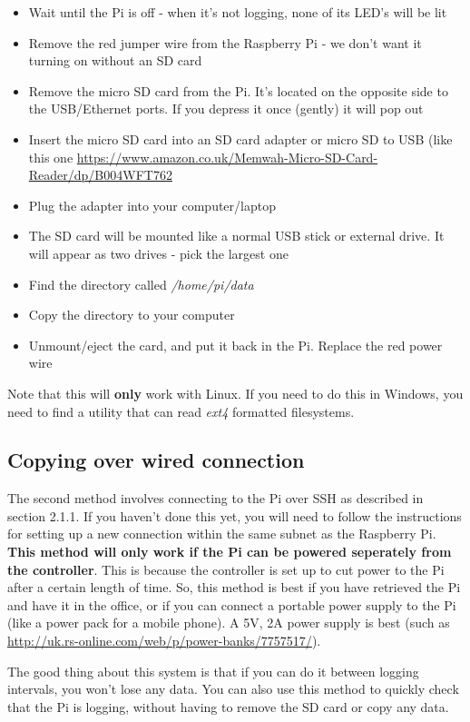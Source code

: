 \documentclass[10pt]{article}
\begin{document}
\begin{itemize}
 \item Wait until the Pi is off - when it's not logging, none of its LED's will be lit 
 \item Remove the red jumper wire from the Raspberry Pi - we don't want it turning on without an SD card
 \item Remove the micro SD card from the Pi. It's located on the opposite side to the USB/Ethernet ports. If you depress it once (gently) it will pop out
 \item Insert the micro SD card into an SD card adapter or micro SD to USB (like this one \url{https://www.amazon.co.uk/Memwah-Micro-SD-Card-Reader/dp/B004WFT762}
 \item Plug the adapter into your computer/laptop
 \item The SD card will be mounted like a normal USB stick or external drive. It will appear as two drives - pick the largest one
 \item Find the directory called \textit{/home/pi/data}
 \item Copy the directory to your computer
 \item Unmount/eject the card, and put it back in the Pi. Replace the red power wire
\end{itemize}

Note that this will \textbf{only} work with Linux. If you need to do this in Windows, you need to find a utility that can read \textit{ext4} formatted filesystems.

\subsection{Copying over wired connection}

The second method involves connecting to the Pi over SSH as described in section 2.1.1. If you haven't done this yet, you will need to follow the instructions for setting up a new connection within the same subnet as the Raspberry Pi. \textbf{This method will only work if the Pi can be powered seperately from the controller}. This is because the controller is set up to cut power to the Pi after a certain length of time. So, this method is best if you have retrieved the Pi and have it in the office, or if you can connect a portable power supply to the Pi (like a power pack for a mobile phone). A 5V, 2A power supply is best (such as \url{http://uk.rs-online.com/web/p/power-banks/7757517/}).

The good thing about this system is that if you can do it between logging intervals, you won't lose any data. You can also use this method to quickly check that the Pi is logging, without having to remove the SD card or copy any data.
\end{document}
